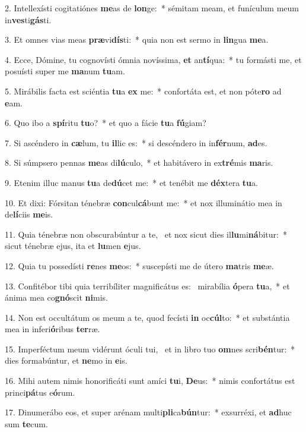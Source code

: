 2. Intellexísti cogitatiónes \textbf{me}as de \textbf{lon}ge:~*  sémitam meam, et funículum meum in\textbf{ves}ti\textbf{gás}ti.\

3. Et omnes vias meas \textbf{præ}vi\textbf{dís}ti:~*  quia non est sermo in \textbf{lin}gua \textbf{me}a.\

4. Ecce, Dómine, tu cognovísti ómnia novíssima, \textbf{et} an\textbf{tí}qua:~*  tu formásti me, et posuísti super me \textbf{ma}num \textbf{tu}am.\

5. Mirábilis facta est sciéntia \textbf{tu}a \textbf{ex} me:~*  confortáta est, et non póte\textbf{ro} ad \textbf{e}am.\

6. Quo ibo a \textbf{spí}ritu \textbf{tu}o?~*  et quo a fácie \textbf{tu}a \textbf{fú}giam?\

7. Si ascéndero in \textbf{cæ}lum, tu \textbf{il}lic es:~*  si descéndero in in\textbf{fér}num, \textbf{ad}es.\

8. Si súmpsero pennas \textbf{me}as di\textbf{lú}culo,~*  et habitávero in ex\textbf{tré}mis \textbf{ma}ris.\

9. Etenim illuc manus \textbf{tu}a de\textbf{dú}cet me:~*  et tenébit me \textbf{déx}tera \textbf{tu}a.\

10. Et dixi: Fórsitan ténebræ \textbf{con}cul\textbf{cá}bunt me:~*  et nox illuminátio mea in de\textbf{lí}ciis \textbf{me}is.\

11. Quia ténebræ non obscurabúntur a te, \dag\  et nox sicut dies il\textbf{lu}mi\textbf{ná}bitur:~*  sicut ténebræ ejus, ita et \textbf{lu}men \textbf{e}jus.\

12. Quia tu possedísti \textbf{re}nes \textbf{me}os:~*  suscepísti me de útero \textbf{ma}tris \textbf{me}æ.\

13. Confitébor tibi quia terribíliter magnificátus es: \dag\  mirabília \textbf{ó}pera \textbf{tu}a,~*  et ánima mea co\textbf{gnó}scit \textbf{ni}mis.\

14. Non est occultátum os meum a te, quod fecísti \textbf{in} oc\textbf{cúl}to:~*  et substántia mea in inferi\textbf{ó}ribus \textbf{ter}ræ.\

15. Imperféctum meum vidérunt óculi tui, \dag\  et in libro tuo \textbf{om}nes scri\textbf{bén}tur:~*  dies formabúntur, et \textbf{ne}mo in \textbf{e}is.\

16. Mihi autem nimis honorificáti sunt amíci \textbf{tu}i, \textbf{De}us:~*  nimis confortátus est princi\textbf{pá}tus e\textbf{ó}rum.\

17. Dinumerábo eos, et super arénam multi\textbf{pli}ca\textbf{bún}tur:~*  exsurréxi, et \textbf{ad}huc sum \textbf{te}cum.\

